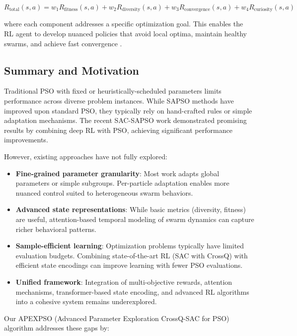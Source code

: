 \begin{equation}
R_{\text{total}}(s, a) = w_1 R_{\text{fitness}}(s, a) + w_2 R_{\text{diversity}}(s, a) + w_3 R_{\text{convergence}}(s, a) + w_4 R_{\text{curiosity}}(s, a)
\end{equation}

where each component addresses a specific optimization goal. This enables the RL agent to develop nuanced policies that avoid local optima, maintain healthy swarms, and achieve fast convergence \cite{Pitis2019}.

\subsection*{Summary and Motivation}
\label{subsec:summary_motivation}

Traditional PSO with fixed or heuristically-scheduled parameters limits performance across diverse problem instances. While SAPSO methods have improved upon standard PSO, they typically rely on hand-crafted rules or simple adaptation mechanisms. The recent SAC-SAPSO work \cite{VonEschwege2024} demonstrated promising results by combining deep RL with PSO, achieving significant performance improvements.

However, existing approaches have not fully explored:

\begin{itemize}
\item \textbf{Fine-grained parameter granularity}: Most work adapts global parameters or simple subgroups. Per-particle adaptation enables more nuanced control suited to heterogeneous swarm behaviors.
\item \textbf{Advanced state representations}: While basic metrics (diversity, fitness) are useful, attention-based temporal modeling of swarm dynamics can capture richer behavioral patterns.
\item \textbf{Sample-efficient learning}: Optimization problems typically have limited evaluation budgets. Combining state-of-the-art RL (SAC with CrossQ) with efficient state encodings can improve learning with fewer PSO evaluations.
\item \textbf{Unified framework}: Integration of multi-objective rewards, attention mechanisms, transformer-based state encoding, and advanced RL algorithms into a cohesive system remains underexplored.
\end{itemize}

Our APEXPSO (Advanced Parameter Exploration CrossQ-SAC for PSO) algorithm addresses these gaps by:

